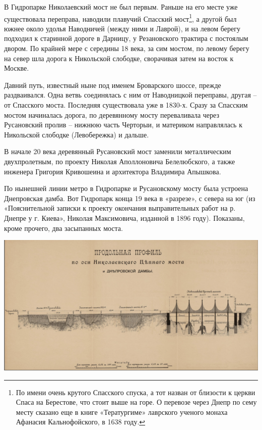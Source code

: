 В Гидропарке Николаевский мост не был первым. Раньше на его месте уже существовала переправа, наводили плавучий Спасский мост\footnote{По имени очень крутого Спасского спуска, а тот назван от близости к церкви Спаса на Берестове, что стоит выше на горе. О перевозе через Днепр по сему месту сказано еще в книге «Тератургиме» лаврского ученого монаха Афанасия Кальнофойского, в 1638 году.}, а другой был южнее около удолья Наводничей (между ними и Лаврой), и на левом берегу подходил к старинной дороге в Дарницу, у Резановского трактира с постоялым двором. По крайней мере с середины 18 века, за сим мостом, по левому берегу на север шла дорога к Никольской слободке, сворачивая затем на восток к Москве.

Давний путь, известный ныне под именем Броварского шоссе, прежде раздваивался. Одна ветвь соединялась с ним от Наводницкой переправы, другая – от Спасского моста. Последняя существовала уже в 1830-х. Сразу за Спасским мостом начиналась дорога, по деревянному мосту переваливала через Русановский пролив – нижнюю часть Черторыи, и материком направлялась к Никольской слободке (Левобережка) и дальше.

В начале 20 века деревянный Русановский мост заменили металлическим двухпролетным, по проекту Николая Аполлоновича Белелюбского, а также инженера Григория Кривошеина и архитектора Владимира Апышкова.

По нынешней линии метро в Гидропарке и Русановскому мосту была устроена Днепровская дамба. Вот Гидропарк конца 19 века в «разрезе», с севера на юг (из «Пояснительной записки к проекту окончания выправительных работ на р. Днепре у г. Киева», Николая Максимовича, изданной в 1896 году). Показаны, кроме прочего, два засыпанных моста.

\begin{center}
\includegraphics[width=\linewidth]{chast-gorodki/cherto/1896-profil.jpg}
\end{center}

